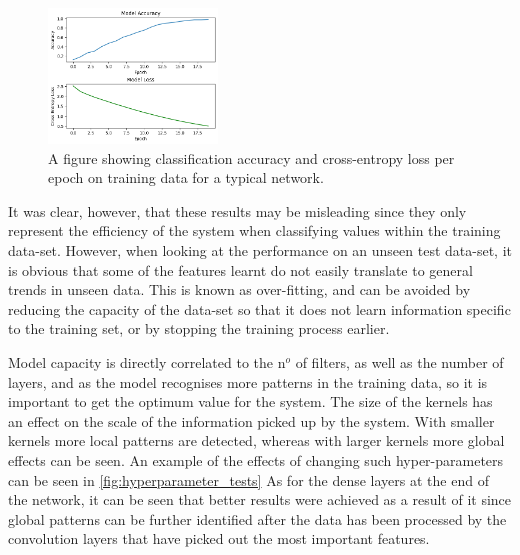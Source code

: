 \begin{figure}[htb]
    \centering
    \includegraphics[width=0.4\textwidth]{implementation/images/accuracy_and_loss_per_epoch.png}
    \caption{A figure showing classification accuracy and cross-entropy loss per epoch on training data for a typical network.}
    \label{fig:accuracy_and_loss_per_epoch}
\end{figure}

It was clear, however, that these results may be misleading since they only represent the efficiency of the system when classifying values within the training data-set. However, when looking at the performance on an unseen test data-set, it is obvious that some of the features learnt do not easily translate to general trends in unseen data. This is known as over-fitting, and can be avoided by reducing the capacity of the data-set so that it does not learn information specific to the training set, or by stopping the training process earlier.

Model capacity is directly correlated to the n$ ^o $ of filters, as well as the number of layers, and as the model recognises more patterns in the training data, so it is important to get the optimum value for the system. The size of the kernels has an effect on the scale of the information picked up by the system. With smaller kernels more local patterns are detected, whereas with larger kernels more global effects can be seen. An example of the effects of changing such hyper-parameters can be seen in \cref{fig:hyperparameter_tests} As for the dense layers at the end of the network, it can be seen that better results were achieved as a result of it since global patterns can be further identified after the data has been processed by the convolution layers that have picked out the most important features.

